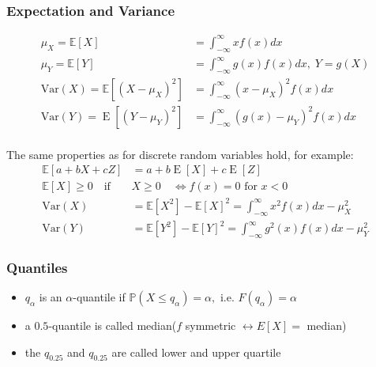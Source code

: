 \subsubsection{Expectation and Variance}
\noindent\begin{align*}
    \mu_X=\mathbb{E}[X]                                 & =\int_{-\infty}^{\infty}xf(x)dx                               \\
    \mu_Y=\mathbb{E}[Y]                                 & =\int_{-\infty}^{\infty}g(x)f(x)dx,\;Y=g(X)                   \\
    \mathrm{Var}(X)=\mathbb{E}[{(X-\mu_{X})}^{2}]       & =\int_{-\infty}^{\infty}{(x-\mu_{X})}^{2}f(x)dx               \\
    \mathrm{Var}(Y)=\operatorname{E}[{(Y-\mu_{Y})}^{2}] & =\int_{-\infty}^{\infty}{\left(g(x)-\mu_{Y}\right)}^{2}f(x)dx
\end{align*}
\\
The same properties as for discrete random variables hold, for example:
\noindent\begin{align*}
    \mathbb{E}[a+bX+cZ]               & =a+b\operatorname{E}[X]+c\operatorname{E}[Z]                                           \\
    \mathbb{E}[X]\geq0\quad\text{if } & X\geq0\quad\Leftrightarrow f(x) = 0 \text{ for } x<0                                   \\
    \mathrm{Var}(X)                   & =\mathbb{E}[X^{2}]-\mathbb{E}[X]^{2}=\int_{-\infty}^{\infty}x^{2}f(x)dx-\mu_{X}^{2}    \\
    \mathrm{Var}(Y)                   & =\mathbb{E}[Y^{2}]-\mathbb{E}[Y]^{2}=\int_{-\infty}^{\infty}g^{2}(x)f(x)dx-\mu_{Y}^{2}
\end{align*}

\subsubsection{Quantiles}
\begin{itemize}
    \item $q_\alpha$ is an $\alpha$-quantile if $\mathbb{P}(X\leq q_\alpha)=\alpha,\text{ i.e. }F(q_\alpha)=\alpha$
    \item a $0.5$-quantile is called median\newline ($f$ symmetric $\leftrightarrow E[X]=$ median)
    \item the $q_{0.25}$ and $q_{0.25}$ are called lower and upper quartile
\end{itemize}


